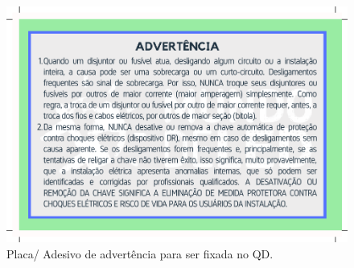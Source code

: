 \begin{figure}[ht]
    \centering
    \includegraphics[scale=0.5]{image/EtiqAdvQD.pdf}
    \caption{Placa/ Adesivo de advertência para ser fixada no QD.}
    \label{fig:advQD}
\end{figure}

